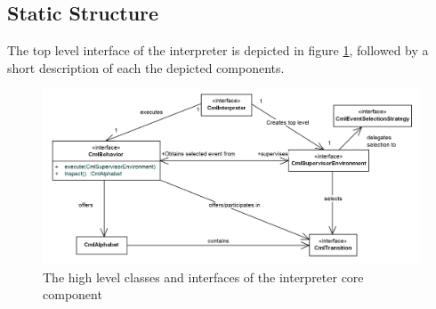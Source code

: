 \documentclass[a4paper, 12pt]{include/compassreport}   %
\begin{document}
\subsection{Static Structure}
\label{sec:dynamic_structure}
The top level interface of the interpreter is depicted in figure
\ref{fig:interpreter_topLevelStructure}, followed by a short
description of each the depicted components.
\begin{figure}[ht!]
  \begin{center}
    \includegraphics[width=1\textwidth]{figures/toplevelStructure}
    \caption{The high level classes and interfaces of the interpreter core component}
    \label{fig:interpreter_topLevelStructure}
  \end{center}
\end{figure}
\end{document}
